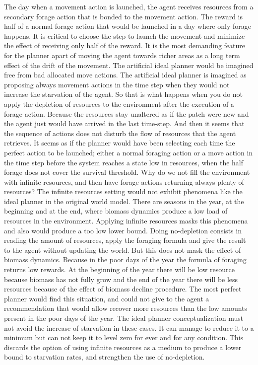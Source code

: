 \documentclass[11pt,oneside,a4paper,openright]{report}
\begin{document}
The day when a movement action is launched, the agent receives resources from a secondary forage action that 
is bonded to the movement action. The reward is half of a normal forage action that would be launched in a 
day where only forage happens. It is critical to choose the step to launch the movement and minimize the 
effect of receiving only half of the reward. It is the most demanding feature for the planner apart of moving 
the agent towards richer areas as a long term effect of the drift of the movement. The artificial ideal planner 
would be imagined free from bad allocated move actions. The artificial ideal planner is imagined as proposing 
always movement actions in the time step when they would not increase the starvation of the agent. So that is 
what happens when you do not apply the depletion of resources to the environment after the execution of a 
forage action. Because the resources stay unaltered as if the patch were new and the agent just would have 
arrived in the last time-step. And then it seems that the sequence of actions does not disturb the flow of 
resources that the agent retrieves. It seems as if the planner would have been selecting each time the perfect 
action to be launched; either a normal foraging action or a move action in the time step before the system reaches 
a state low in resources, when the half forage does not cover the survival threshold. 
Why do we not fill the environment with infinite resources, and then have forage actions returning always
plenty of resources? The infinite resources setting would not exhibit phenomena like the ideal planner in the 
original world model. There are seasons in the year, at the beginning and at the end, where biomass dynamics 
produce a low load of resources in the environment. Applying infinite resources masks this phenomena and also
would produce a too low lower bound. Doing no-depletion consists in reading the amount of resources, apply the 
foraging formula and give the result to the agent without updating the world. But this does not mask the 
effect of biomass dynamics. Because in the poor days of the year the formula of foraging returns low rewards.
At the beginning of the year there will be low resource because biomass has not fully grow and the end of the 
year there will be less resources because of the effect of biomass decline procedure. The most perfect planner 
would find this situation, and could not give to the agent a recommendation that would allow recover more 
resources than the low amounts present in the poor days of the year. The ideal planner conceptualization must 
not avoid the increase of starvation in these cases. It can manage to reduce it to a minimum but can not keep 
it to level zero for ever and for any condition. This discards the option of using infinite resources as a 
medium to produce a lower bound to starvation rates, and strengthen the use of no-depletion.
\end{document}
